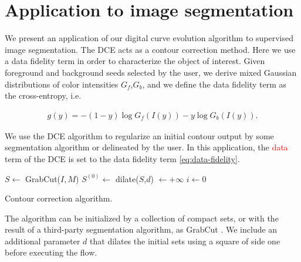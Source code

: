 \documentclass[smallextended]{svjour3}       %
\newcommand{\revision}[1]{\textcolor{red}{#1}}
\begin{document}
{{\section{Application to image segmentation}

We present an application of our digital curve evolution algorithm to supervised image segmentation. The DCE acts as a
contour correction method. Here we use a data fidelity term in order to characterize the object of
interest. Given foreground and background seeds selected by the user, we derive mixed Gaussian distributions of color
intensities $G_f$,$G_b$, and we define the data fidelity term as the cross-entropy, i.e.
	
\begin{align}
  g(y) = -(1-y)\log{G_f(I(y))} - y\log{G_b(I(y))}.
  \label{eq:data-fidelity}
\end{align}	

We use the DCE algorithm to regularize an initial contour output by some segmentation algorithm or delineated by the user. In this application, the \revision{data} term of the DCE
is set to the data fidelity term \eqref{eq:data-fidelity}.
	
\begin{algorithm}
 
 \BlankLine

 $S \longleftarrow$ GrabCut($I,M$)\;
 $S^{(0)} \longleftarrow $ dilate($S$,$d$)\; 
 \Delta $\longleftarrow +\infty$\;
 $i \longleftarrow 0$\;
 \label{alg:contour-correction} 
 \caption{Contour correction algorithm.}
\end{algorithm}	

The algorithm can be initialized by a collection of compact sets, or with the result of a third-party segmentation algorithm, as GrabCut \cite{rother04grabcut}. We include an additional parameter $d$ that dilates the initial sets using a square of side one before executing the flow.
	
}}
\end{document}
